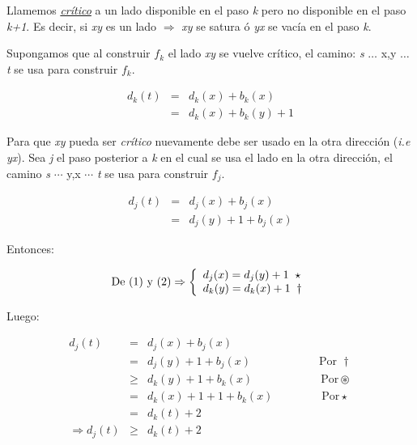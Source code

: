 \documentclass[12pt,a4paper]{report}
\begin{document}
		Llamemos \textit{\underline{crítico}} a un lado disponible en el paso \textit{k} pero no disponible en el paso \textit{k+1}. Es decir, si \textit{xy} es un lado $\Rightarrow$ \textit{xy} se satura ó \textit{yx} se vacía en el paso \textit{k}.

		Supongamos que al construir $f_{k}$ el lado \textit{xy} se vuelve crítico, el camino: \textit{s} $\dotsc$ x,y $\dotsc$ \textit{t} se usa para construir $f_{k}$.

		\begin{eqnarray}
			 d_{k}(\textit{t}) & = & d_{k}(x)+ b_{k}(x) \\
			\nonumber & = & d_{k}(x)+b_{k}(y)+1
		\end{eqnarray}

		 Para que \textit{xy} pueda ser \textit{crítico} nuevamente debe ser usado en la otra dirección (\textit{i.e yx}). Sea \textit{j} el paso posterior a \textit{k} en el cual se usa el lado en la otra dirección, el camino \textit{s} $\dotsb$ y,x $\dotsb$ \textit{t} se usa para construir $f_{j}$.

		\begin{eqnarray}
			d_{j}(\textit{t}) & = & d_{j}(x)+ b_{j}(x) \\
			\nonumber & = & d_{j}(y)+1+b_{j}(x)
		\end{eqnarray}

		Entonces:

		\begin{equation*}
			\textup{De (1) y (2)} \Rightarrow
  			\left \lbrace
  			\begin{array}{l}
    		 d_{j}(x) = d_{j}(y)+1 \; \; \star \\
     		 d_{k}(y) = d_{k}(x)+1 \; \; \dag\\
  			\end{array}
  			\right.
		\end{equation*}

		Luego:

		\begin{eqnarray}
			\nonumber d_{j}(\textit{t}) & = & d_{j}(x)+ b_{j}(x) \\
			\nonumber & = & d_{j}(y)+1+b_{j}(x) \qquad\qquad\qquad\text{Por } \dag\\
			\nonumber & \geq & d_{k}(y)+1+b_{k}(x) \qquad\qquad\qquad\text{Por} \circledast \\
			\nonumber & = & d_{k}(x)+1+1+b_{k}(x) \;\qquad\qquad\text{Por} \star \\
			\nonumber & = & d_{k}(\textit{t})+2 \\
			\nonumber \Rightarrow d_{j}(\textit{t}) & \geq & d_{k}(\textit{t})+2
		\end{eqnarray}
\end{document}
